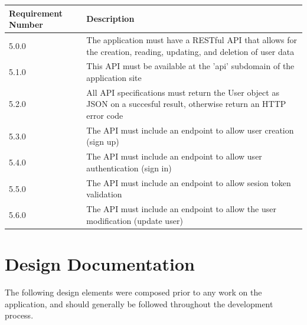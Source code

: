 \documentclass[12pt]{article}
\begin{document}
\setlength{\tabcolsep}{1cm}
\begin{tabular}{|l|p{8cm}|}
    \hline
    Requirement Number & Description                                                                                                           \\

    \hline\hline
    5.0.0              & The application must have a RESTful API that allows for the creation, reading, updating, and deletion of user data    \\

    \hline\hline
    5.1.0              & This API must be available at the 'api' subdomain of the application site                                             \\

    \hline\hline
    5.2.0              & All API specifications must return the User object as JSON on a succesful result, otherwise return an HTTP error code \\

    \hline\hline
    5.3.0              & The API must include an endpoint to allow user creation (sign up)                                                     \\

    \hline\hline
    5.4.0              & The API must include an endpoint to allow user authentication (sign in)                                               \\

    \hline\hline
    5.5.0              & The API must include an endpoint to allow sesion token validation                                                     \\

    \hline\hline
    5.6.0              & The API must include an endpoint to allow the user modification (update user)                                         \\

    \hline
\end{tabular}

\newpage

\section{Design Documentation}

The following design elements were composed prior to any work on the application, and should generally be followed throughout the development process.
\end{document}
